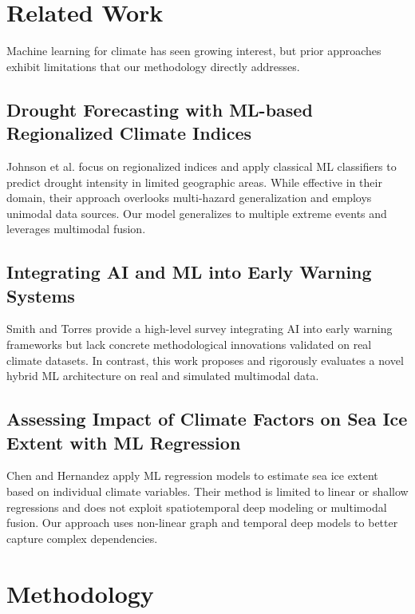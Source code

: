 \section{Related Work}

Machine learning for climate has seen growing interest, but prior approaches exhibit limitations that our methodology directly addresses. 

\subsection{Drought Forecasting with ML-based Regionalized Climate Indices \cite{johnson2025drought}}

Johnson et al. focus on regionalized indices and apply classical ML classifiers to predict drought intensity in limited geographic areas. While effective in their domain, their approach overlooks multi-hazard generalization and employs unimodal data sources. Our model generalizes to multiple extreme events and leverages multimodal fusion.

\subsection{Integrating AI and ML into Early Warning Systems \cite{smith2025early}}

Smith and Torres provide a high-level survey integrating AI into early warning frameworks but lack concrete methodological innovations validated on real climate datasets. In contrast, this work proposes and rigorously evaluates a novel hybrid ML architecture on real and simulated multimodal data.

\subsection{Assessing Impact of Climate Factors on Sea Ice Extent with ML Regression \cite{chen2023seaice}}

Chen and Hernandez apply ML regression models to estimate sea ice extent based on individual climate variables. Their method is limited to linear or shallow regressions and does not exploit spatiotemporal deep modeling or multimodal fusion. Our approach uses non-linear graph and temporal deep models to better capture complex dependencies.

\section{Methodology}

